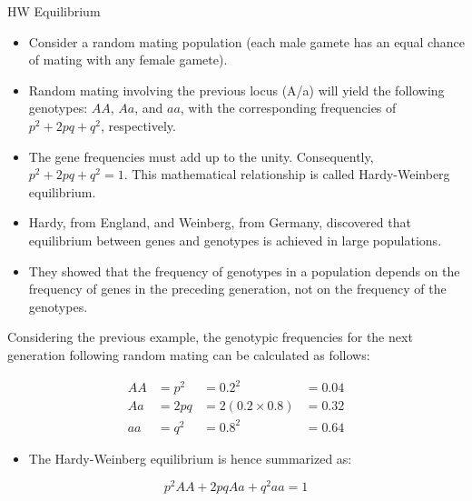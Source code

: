 \documentclass[11pt,ignorenonframetext,aspectratio=169]{beamer}
\providecommand{\tightlist}{%
  \setlength{\itemsep}{0pt}\setlength{\parskip}{0pt}}
\begin{document}
\begin{frame}{HW Equilibrium}
\protect\hypertarget{hw-equilibrium}{}
\begin{itemize}
\tightlist
\item
  Consider a random mating population (each male gamete has an equal
  chance of mating with any female gamete).
\item
  Random mating involving the previous locus (A/a) will yield the
  following genotypes: \(AA\), \(Aa\), and \(aa\), with the
  corresponding frequencies of \(p^2+2pq+q^2\), respectively.
\item
  The gene frequencies must add up to the unity. Consequently,
  \(p^2+2pq+q^2 = 1\). This mathematical relationship is called
  Hardy-Weinberg equilibrium.
\item
  Hardy, from England, and Weinberg, from Germany, discovered that
  equilibrium between genes and genotypes is achieved in large
  populations.
\item
  They showed that the frequency of genotypes in a population depends on
  the frequency of genes in the preceding generation, not on the
  frequency of the genotypes.
\end{itemize}
\end{frame}

\begin{frame}{}
\protect\hypertarget{section-8}{}
Considering the previous example, the genotypic frequencies for the next
generation following random mating can be calculated as follows:

\[
\begin{aligned}
AA &= p^2 &= 0.2^2 &= 0.04 \\
Aa &= 2pq &= 2 (0.2\times0.8) &= 0.32 \\
aa &= q^2 &= 0.8^2 &= 0.64
\end{aligned}
\]

\begin{itemize}
\tightlist
\item
  The Hardy-Weinberg equilibrium is hence summarized as:
\end{itemize}

\[
p^2AA + 2pqAa + q^2aa = 1
\]
\end{frame}
\end{document}
